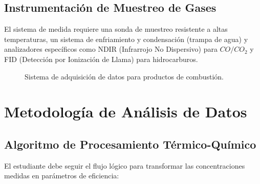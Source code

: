 \documentclass[11pt, a4paper]{article}
\begin{document}
\subsection{Instrumentación de Muestreo de Gases}
El sistema de medida requiere una sonda de muestreo resistente a altas temperaturas, un sistema de enfriamiento y condensación (trampa de agua) y analizadores específicos como NDIR (Infrarrojo No Dispersivo) para $CO/CO_2$ y FID (Detección por Ionización de Llama) para hidrocarburos.

\begin{figure}[htbp]
    \centering
    \caption{Sistema de adquisición de datos para productos de combustión.}
\end{figure}

\section{Metodología de Análisis de Datos}

\subsection{Algoritmo de Procesamiento Térmico-Químico}
El estudiante debe seguir el flujo lógico para transformar las concentraciones medidas en parámetros de eficiencia:
\end{document}
